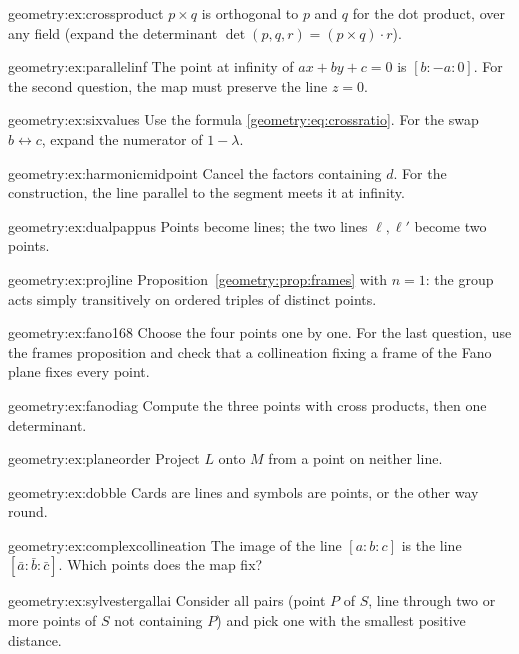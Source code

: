 \begin{hint}{geometry:ex:crossproduct}
$p\times q$ is orthogonal to $p$ and $q$ for the dot product, over any field (expand the determinant $\det(p,q,r)=(p\times q)\cdot r$).
\end{hint}
\begin{hint}{geometry:ex:parallelinf}
The point at infinity of $ax+by+c=0$ is $[b:-a:0]$. For the second question, the map must preserve the line $z=0$.
\end{hint}
\begin{hint}{geometry:ex:sixvalues}
Use the formula \eqref{geometry:eq:crossratio}. For the swap $b\leftrightarrow c$, expand the numerator of $1-\lambda$.
\end{hint}
\begin{hint}{geometry:ex:harmonicmidpoint}
Cancel the factors containing $d$. For the construction, the line parallel to the segment meets it at infinity.
\end{hint}
\begin{hint}{geometry:ex:dualpappus}
Points become lines; the two lines $\ell,\ell'$ become two points.
\end{hint}
\begin{hint}{geometry:ex:projline}
Proposition~\ref{geometry:prop:frames} with $n=1$: the group acts simply transitively on ordered triples of distinct points.
\end{hint}
\begin{hint}{geometry:ex:fano168}
Choose the four points one by one. For the last question, use the frames proposition and check that a collineation fixing a frame of the Fano
plane fixes every point.
\end{hint}
\begin{hint}{geometry:ex:fanodiag}
Compute the three points with cross products, then one determinant.
\end{hint}
\begin{hint}{geometry:ex:planeorder}
Project $L$ onto $M$ from a point on neither line.
\end{hint}
\begin{hint}{geometry:ex:dobble}
Cards are lines and symbols are points, or the other way round.
\end{hint}
\begin{hint}{geometry:ex:complexcollineation}
The image of the line $[a:b:c]$ is the line $[\bar a:\bar b:\bar c]$. Which points does the map fix?
\end{hint}
\begin{hint}{geometry:ex:sylvestergallai}
Consider all pairs (point $P$ of $S$, line through two or more points of $S$ not containing $P$) and pick one with the smallest positive distance.
\end{hint}

